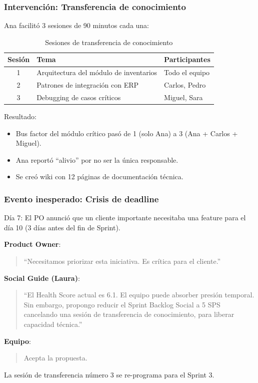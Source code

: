 \subsubsection{Intervención: Transferencia de conocimiento}

Ana facilitó 3 sesiones de 90 minutos cada una:

\begin{table}[h]
    \centering
    \small
    \begin{tabularx}{\textwidth}{|c|X|l|}
        \hline
        \textbf{Sesión} & \textbf{Tema}                          & \textbf{Participantes} \\
        \hline
        1               & Arquitectura del módulo de inventarios & Todo el equipo         \\
        \hline
        2               & Patrones de integración con ERP        & Carlos, Pedro          \\
        \hline
        3               & Debugging de casos críticos            & Miguel, Sara           \\
        \hline
    \end{tabularx}
    \caption{Sesiones de transferencia de conocimiento}
    \label{tab:transferencia-conocimiento}
\end{table}
\FloatBarrier

Resultado:
\begin{itemize}
    \item Bus factor del módulo crítico pasó de 1 (solo Ana) a 3 (Ana + Carlos + Miguel).
    \item Ana reportó ``alivio'' por no ser la única responsable.
    \item Se creó wiki con 12 páginas de documentación técnica.
\end{itemize}

\subsubsection{Evento inesperado: Crisis de deadline}

Día 7: El PO anunció que un cliente importante necesitaba una feature para el día 10 (3 días antes del fin de Sprint).

\begin{escenario}
    \textbf{Product Owner}:
    \begin{quote}
        ``Necesitamos priorizar esta iniciativa. Es crítica para el cliente.''
    \end{quote}
    \textbf{Social Guide (Laura)}:
    \begin{quote}
        ``El Health Score actual es 6.1. El equipo puede absorber presión temporal. Sin embargo, propongo reducir el Sprint Backlog Social a 5 SPS cancelando una sesión de transferencia de conocimiento, para liberar capacidad técnica.''
    \end{quote}
    \textbf{Equipo}:
    \begin{quote}
        Acepta la propuesta.
    \end{quote}
    La sesión de transferencia número 3 se re-programa para el Sprint 3.

\end{escenario}


